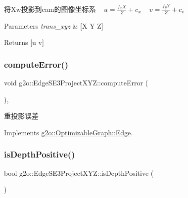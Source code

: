 将\+Xw投影到cam的图像坐标系 ~\newline
 $ u = \frac{f_x X}{Z} + c_x $ ~\newline
 $ v = \frac{f_y Y}{Z} + c_v $ ~\newline

\begin{DoxyParams}{Parameters}
{\em trans\+\_\+xyz} & \mbox{[}X Y Z\mbox{]} \\
\hline
\end{DoxyParams}
\begin{DoxyReturn}{Returns}
\mbox{[}u v\mbox{]} 
\end{DoxyReturn}
\mbox{\label{classg2o_1_1_edge_s_e3_project_x_y_z_a79a763e1d42fe9eb5732abe59c7723d9}} 
\subsubsection{\texorpdfstring{compute\+Error()}{computeError()}}
{\footnotesize\ttfamily void g2o\+::\+Edge\+S\+E3\+Project\+X\+Y\+Z\+::compute\+Error (\begin{DoxyParamCaption}{ }\end{DoxyParamCaption})\hspace{0.3cm}{\ttfamily [inline]}, {\ttfamily [virtual]}}

重投影误差 

Implements \mbox{\hyperlink{classg2o_1_1_optimizable_graph_1_1_edge_a1e6d9f4128866982de5e11e03edd7775}{g2o\+::\+Optimizable\+Graph\+::\+Edge}}.

\mbox{\label{classg2o_1_1_edge_s_e3_project_x_y_z_a603cc0018b5b05fd193e84e032a66d07}} 
\subsubsection{\texorpdfstring{is\+Depth\+Positive()}{isDepthPositive()}}
{\footnotesize\ttfamily bool g2o\+::\+Edge\+S\+E3\+Project\+X\+Y\+Z\+::is\+Depth\+Positive (\begin{DoxyParamCaption}{ }\end{DoxyParamCaption})\hspace{0.3cm}{\ttfamily [inline]}}

